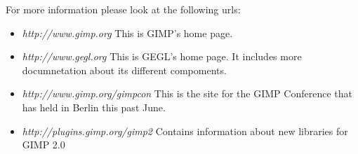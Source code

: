 
For more information please look at the following urls:
\begin{itemize}
\item {\em http://www.gimp.org} This is GIMP's home page.
\item {\em http://www.gegl.org} This is GEGL's home page. It includes more documnetation about its different compoments.
\item {\em http://www.gimp.org/gimpcon} This is the site for the GIMP Conference that has held in Berlin this past June.
\item {\em http://plugins.gimp.org/gimp2} Contains information about new libraries for GIMP 2.0
\end{itemize}
 



